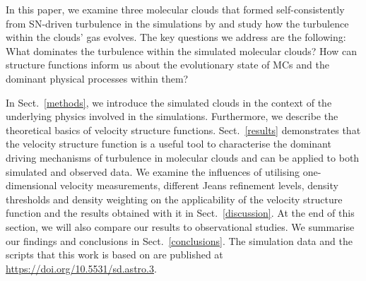 In this paper, we examine three molecular clouds that formed self-consistently from SN-driven turbulence in the simulations by \citet[ and  hereafter]{IbanezMejia2016,IbanezMejia2017} and study how the turbulence within the clouds' gas evolves.
The key questions we address are the following: 
What dominates the turbulence within the simulated molecular clouds? 
How can structure functions inform us about the evolutionary state of MCs and the dominant physical processes within them?

In Sect.~\ref{methods}, we introduce the simulated clouds in the context of the underlying physics involved in the simulations.
Furthermore, we describe the theoretical basics of velocity structure functions.
Sect.~\ref{results} demonstrates that the velocity structure function is a useful tool to characterise the dominant driving mechanisms of turbulence in molecular clouds and can be applied to both simulated and observed data. 
We examine the influences of utilising one-dimensional velocity measurements, different Jeans refinement levels, density thresholds and density weighting on the applicability of the velocity structure function and the results obtained with it in Sect.~\ref{discussion}.  
At the end of this section, we will also compare our results to observational studies.
We summarise our findings and conclusions in Sect.~\ref{conclusions}.  The simulation data and the scripts that this work is based on are published 
at {\url{https://doi.org/10.5531/sd.astro.3}}.




\endinput
